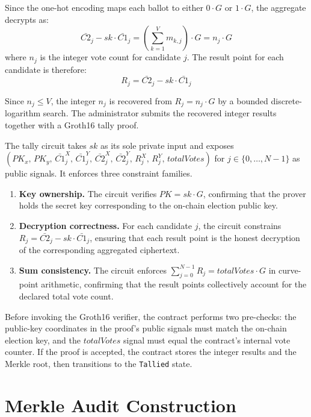 Since the one-hot encoding maps each ballot to either $0 \cdot G$ or $1 \cdot G$, the aggregate decrypts as:
\begin{equation}
\bar{C2}_j - \mathit{sk} \cdot \bar{C1}_j = \left(\sum_{k=1}^{V} m_{k,j}\right) \cdot G = n_j \cdot G
\end{equation}
where $n_j$ is the integer vote count for candidate $j$. The result point for each candidate is therefore:
\begin{equation}
R_j = \bar{C2}_j - \mathit{sk} \cdot \bar{C1}_j
\end{equation}

Since $n_j \le V$, the integer $n_j$ is recovered from $R_j = n_j \cdot G$ by a bounded discrete-logarithm search. The administrator submits the recovered integer results together with a Groth16 tally proof.

The tally circuit takes $\mathit{sk}$ as its sole private input and exposes $(\mathit{PK}_x,\, \mathit{PK}_y,\, \bar{C1}^{X}_j,\, \bar{C1}^{Y}_j,\, \bar{C2}^{X}_j,\, \bar{C2}^{Y}_j,\, R^{X}_j,\, R^{Y}_j,\, \mathit{totalVotes})$ for $j \in \{0,\dots,N{-}1\}$ as public signals. It enforces three constraint families.
\begin{enumerate}
    \item \textbf{Key ownership.} The circuit verifies $\mathit{PK} = \mathit{sk} \cdot G$, confirming that the prover holds the secret key corresponding to the on-chain election public key.
    \item \textbf{Decryption correctness.} For each candidate $j$, the circuit constrains $R_j = \bar{C2}_j - \mathit{sk} \cdot \bar{C1}_j$, ensuring that each result point is the honest decryption of the corresponding aggregated ciphertext.
    \item \textbf{Sum consistency.} The circuit enforces $\sum_{j=0}^{N-1} R_j = \mathit{totalVotes} \cdot G$ in curve-point arithmetic, confirming that the result points collectively account for the declared total vote count.
\end{enumerate}

Before invoking the Groth16 verifier, the contract performs two pre-checks: the public-key coordinates in the proof's public signals must match the on-chain election key, and the $\mathit{totalVotes}$ signal must equal the contract's internal vote counter. If the proof is accepted, the contract stores the integer results and the Merkle root, then transitions to the \texttt{Tallied} state.

\section{Merkle Audit Construction}

